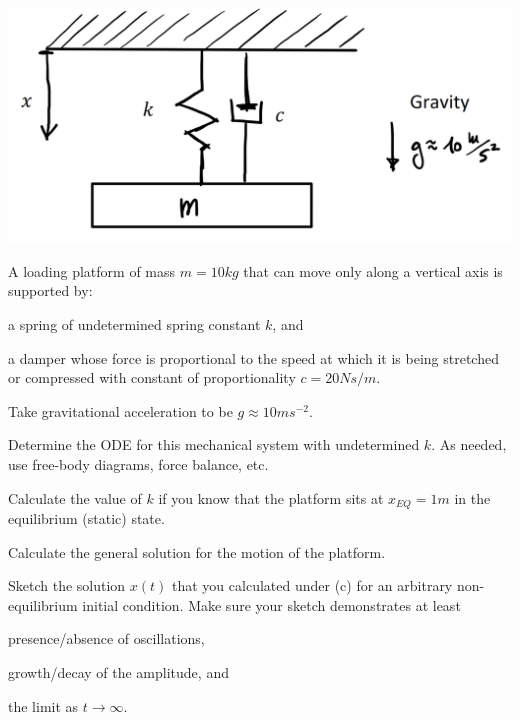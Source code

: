 \documentclass[10pt,twoside,sfsidenotes]{tufte-handout}
\begin{document}
\clearpage
\begin{question}
  \begin{marginfigure}
    \includegraphics[width=\linewidth]{Exam_figs/rig.png}
  \end{marginfigure}
  A loading platform of mass \(m=10 \si{kg}\) that can move only along a vertical axis is supported by:
  \begin{compactitem}
    \item  a spring of undetermined spring constant \(k\), and
    \item a damper whose force is proportional to the speed at which it is being stretched or compressed with constant of proportionality \(c = 20 \si{N}\si{s}/\si{m}\).
  \end{compactitem}
   Take gravitational acceleration to be \(g \approx 10 \si{m}\si{s}^{-2}\).

  \begin{compactenum}[(a)]
    \item Determine the ODE for this mechanical system with undetermined \(k\). As needed, use free-body diagrams, force balance, etc.
    \item Calculate the value of \(k\) if you know that the platform sits at \(x_{EQ} = 1 \si{m}\) in the equilibrium (static) state.
    \item {} Calculate the general solution for the motion of the platform.
    \item Sketch the solution \(x(t)\) that you calculated under (c) for an arbitrary non-equilibrium initial condition. Make sure your sketch demonstrates at least
      \begin{inparaenum}[(i)]
        \item presence/absence of oscillations,
        \item growth/decay of the amplitude, and 
        \item the limit as \(t\to\infty\).
      \end{inparaenum}
  \end{compactenum}
\end{question}
\end{document}
